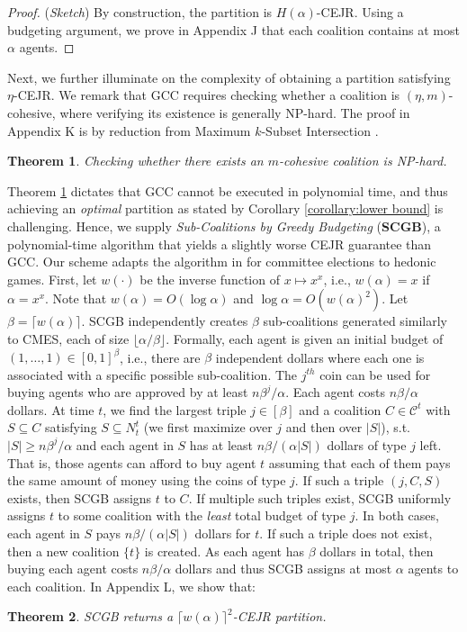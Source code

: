 \documentclass[letterpaper]{article}
\newtheorem{theorem}{Theorem}
\begin{document}
\begin{proof}
(\textit{Sketch})
By construction, the partition is $H(\alpha)$-CEJR. Using a budgeting argument, we prove in Appendix J that each coalition contains at most $\alpha$ agents.
\end{proof}  Next, we further illuminate on the complexity of obtaining a partition satisfying $\eta$-CEJR. We remark that GCC requires checking whether a coalition is $(\eta, m)$-cohesive, where verifying its existence is generally NP-hard. The proof in Appendix K is by reduction from Maximum $k$-Subset Intersection \cite{xavier2012note}.  \begin{theorem}
\label{thm:cohesive np hard}
Checking whether there exists an $m$-cohesive coalition is NP-hard.
\end{theorem}  Theorem \ref{thm:cohesive np hard} dictates that GCC cannot be executed in polynomial time, and thus achieving an \textit{optimal} partition as stated by Corollary \ref{corollary:lower bound} is challenging. Hence, we supply \textit{Sub-Coalitions by Greedy Budgeting} (\textbf{SCGB}), a polynomial-time algorithm that yields a slightly worse CEJR guarantee than GCC. Our scheme adapts the algorithm in \cite[Section 5.3]{do2022online} for committee elections to hedonic games. First, let $w(\cdot)$ be the inverse function of $x \mapsto x^x$, i.e., $w(\alpha) = x$ if $\alpha = x^x$. Note that $w(\alpha) = O(\log \alpha)$ and $\log \alpha = O(w(\alpha)^2)$. Let $\beta = \lceil w(\alpha) \rceil$. SCGB independently creates $\beta$ sub-coalitions generated similarly to CMES, each of size $\lfloor \alpha/\beta \rfloor$. Formally, each agent is given an initial budget of $(1, \dots, 1) \in [0,1]^\beta$, i.e., there are $\beta$ independent dollars where each one is associated with a specific possible sub-coalition. The $j^{th}$ coin can be used for buying agents who are approved by at least $n \beta^j /\alpha$. Each agent costs $n \beta/\alpha$ dollars. At time $t$, we find the largest triple $j \in [\beta]$ and a coalition $C \in \mathcal{C}^t$ with $S \subseteq C$ satisfying $S \subseteq N_t^t$ (we first maximize over $j$ and then over $|S|$), s.t. $|S| \geq n \beta^j /\alpha$ and each agent in $S$ has at least $n\beta /(\alpha |S|)$ dollars of type $j$ left. That is, those agents can afford to buy agent $t$ assuming that each of them pays the same amount of money using the coins of type $j$. If such a triple $(j,C,S)$ exists, then SCGB assigns $t$ to $C$. If multiple such triples exist, SCGB uniformly assigns $t$ to some coalition with the \textit{least} total budget of type $j$. In both cases, each agent in $S$ pays $n\beta /(\alpha |S|)$ dollars for $t$. If such a triple does not exist, then a new coalition $\{t\}$ is created. As each agent has $\beta$ dollars in total, then buying each agent costs $n \beta/\alpha$ dollars and thus SCGB assigns at most $\alpha$ agents to each coalition. In Appendix L, we show that:  \begin{theorem}
\label{thm:scgb}
SCGB returns a $\lceil w(\alpha) \rceil^2$-CEJR partition.
\end{theorem}
\end{document}
